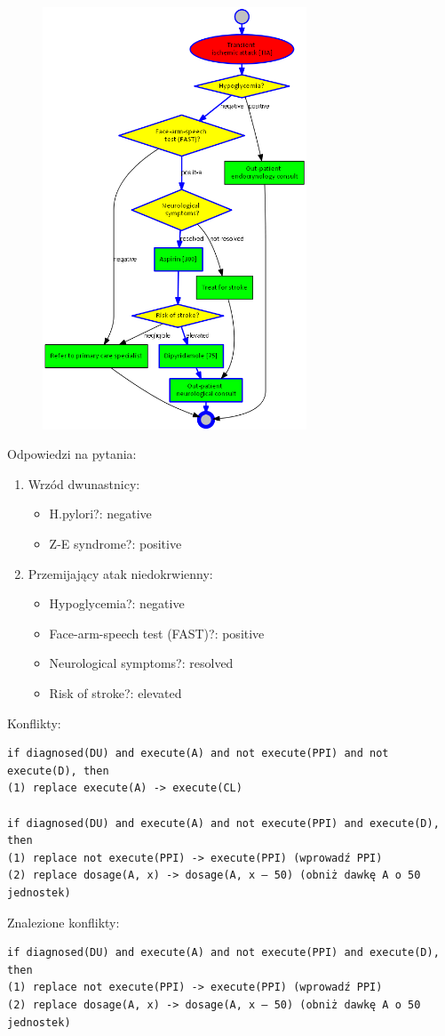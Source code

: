\begin{figure}[H]
\centering
\includegraphics[width=0.7\textwidth]{img/tia.png}
\end{figure}
\newpage
\noindent Odpowiedzi na pytania:
\begin{enumerate}
\item{Wrzód dwunastnicy:
	\begin{itemize}
	\item{H.pylori?: negative}
	\item{Z-E syndrome?: positive}
	\end{itemize}
}
\item{Przemijający atak niedokrwienny:
	\begin{itemize}
	\item{Hypoglycemia?: negative}
	\item{Face-arm-speech test (FAST)?: positive}
	\item{Neurological symptoms?: resolved}
	\item{Risk of stroke?: elevated}
	\end{itemize}
}
\end{enumerate}
Konflikty:
\begin{verbatim}
if diagnosed(DU) and execute(A) and not execute(PPI) and not execute(D), then 
(1) replace execute(A) -> execute(CL)

if diagnosed(DU) and execute(A) and not execute(PPI) and execute(D), then
(1) replace not execute(PPI) -> execute(PPI) (wprowadź PPI)
(2) replace dosage(A, x) -> dosage(A, x – 50) (obniż dawkę A o 50 jednostek)
\end{verbatim}
Znalezione konflikty:
\begin{verbatim}
if diagnosed(DU) and execute(A) and not execute(PPI) and execute(D), then
(1) replace not execute(PPI) -> execute(PPI) (wprowadź PPI)
(2) replace dosage(A, x) -> dosage(A, x – 50) (obniż dawkę A o 50 jednostek)
\end{verbatim}

